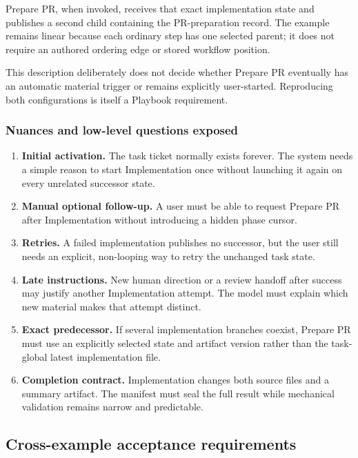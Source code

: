 \documentclass[11pt]{article}
\begin{document}
Prepare PR, when invoked, receives that exact implementation state and publishes a second child containing the PR-preparation record. The example remains linear because each ordinary step has one selected parent; it does not require an authored ordering edge or stored workflow position.

This description deliberately does not decide whether Prepare PR eventually has an automatic material trigger or remains explicitly user-started. Reproducing both configurations is itself a Playbook requirement.

\subsubsection{Nuances and low-level questions exposed}

\begin{enumerate}
  \item \textbf{Initial activation.} The task ticket normally exists forever. The system needs a simple reason to start Implementation once without launching it again on every unrelated successor state.
  \item \textbf{Manual optional follow-up.} A user must be able to request Prepare PR after Implementation without introducing a hidden phase cursor.
  \item \textbf{Retries.} A failed implementation publishes no successor, but the user still needs an explicit, non-looping way to retry the unchanged task state.
  \item \textbf{Late instructions.} New human direction or a review handoff after success may justify another Implementation attempt. The model must explain which new material makes that attempt distinct.
  \item \textbf{Exact predecessor.} If several implementation branches coexist, Prepare PR must use an explicitly selected state and artifact version rather than the task-global latest implementation file.
  \item \textbf{Completion contract.} Implementation changes both source files and a summary artifact. The manifest must seal the full result while mechanical validation remains narrow and predictable.
\end{enumerate}

\subsection{Cross-example acceptance requirements}
\end{document}
